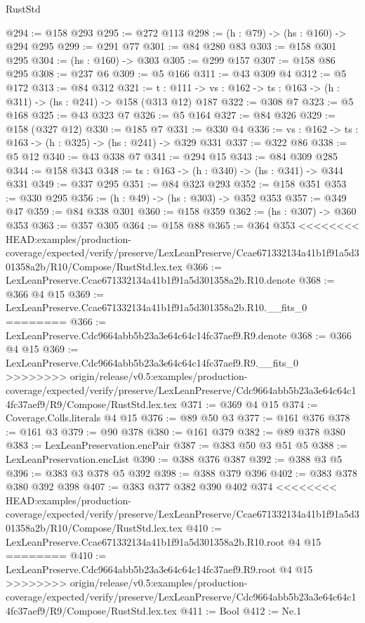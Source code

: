 \begin{lexlean}{RustStd}
\begin{coremodule}
{\begin{coremodule}
@294 := @158 @293
@295 := @272 @113
@298 := (h : @79) -> (hs : @160) -> @294 @295
@299 := @291 @77
@301 := @84 @280 @83
@303 := @158 @301 @295
@304 := (hs : @160) -> @303
@305 := @299 @157
@307 := @158 @86 @295
@308 := @237 @6
@309 := @5 @166
@311 := @43 @309 @4
@312 := @5 @172
@313 := @84 @312
@321 := {t : @111} ->
  {vs : @162} -> {ts : @163} -> (h : @311) -> (hs : @241) -> @158 (@313 @12) @187
@322 := @308 @7
@323 := @5 @168
@325 := @43 @323 @7
@326 := @5 @164
@327 := @84 @326
@329 := @158 (@327 @12)
@330 := @185 @7
@331 := @330 @4
@336 := {vs : @162} -> {ts : @163} -> (h : @325) -> (hs : @241) -> @329 @331
@337 := @322 @86
@338 := @5 @12
@340 := @43 @338 @7
@341 := @294 @15
@343 := @84 @309 @285
@344 := @158 @343
@348 := {ts : @163} -> (h : @340) -> (hs : @341) -> @344 @331
@349 := @337 @295
@351 := @84 @323 @293
@352 := @158 @351
@353 := @330 @295
@356 := (h : @49) -> (hs : @303) -> @352 @353
@357 := @349 @47
@359 := @84 @338 @301
@360 := @158 @359
@362 := (hs : @307) -> @360 @353
@363 := @357 @305
@364 := @158 @88
@365 := @364 @353
<<<<<<<< HEAD:examples/production-coverage/expected/verify/preserve/LexLeanPreserve/Ccae671332134a41b1f91a5d301358a2b/R10/Compose/RustStd.lex.tex
@366 := LexLeanPreserve.Ccae671332134a41b1f91a5d301358a2b.R10.denote
@368 := @366 @4 @15
@369 := LexLeanPreserve.Ccae671332134a41b1f91a5d301358a2b.R10.__fits_0
========
@366 := LexLeanPreserve.Cdc9664abb5b23a3e64c64c14fc37aef9.R9.denote
@368 := @366 @4 @15
@369 := LexLeanPreserve.Cdc9664abb5b23a3e64c64c14fc37aef9.R9.__fits_0
>>>>>>>> origin/release/v0.5:examples/production-coverage/expected/verify/preserve/LexLeanPreserve/Cdc9664abb5b23a3e64c64c14fc37aef9/R9/Compose/RustStd.lex.tex
@371 := @369 @4 @15
@374 := Coverage.Colls.literals @4 @15
@376 := @89 @50 @3
@377 := @161 @376
@378 := @161 @3
@379 := @90 @378
@380 := @161 @379
@382 := @89 @378 @380
@383 := LexLeanPreservation.encPair
@387 := @383 @50 @3 @51 @5
@388 := LexLeanPreservation.encList
@390 := @388 @376 @387
@392 := @388 @3 @5
@396 := @383 @3 @378 @5 @392
@398 := @388 @379 @396
@402 := @383 @378 @380 @392 @398
@407 := @383 @377 @382 @390 @402 @374
<<<<<<<< HEAD:examples/production-coverage/expected/verify/preserve/LexLeanPreserve/Ccae671332134a41b1f91a5d301358a2b/R10/Compose/RustStd.lex.tex
@410 := LexLeanPreserve.Ccae671332134a41b1f91a5d301358a2b.R10.root @4 @15
========
@410 := LexLeanPreserve.Cdc9664abb5b23a3e64c64c14fc37aef9.R9.root @4 @15
>>>>>>>> origin/release/v0.5:examples/production-coverage/expected/verify/preserve/LexLeanPreserve/Cdc9664abb5b23a3e64c64c14fc37aef9/R9/Compose/RustStd.lex.tex
@411 := Bool
@412 := Ne.{1}

\end{coremodule}}
\end{coremodule}
\end{lexlean}
